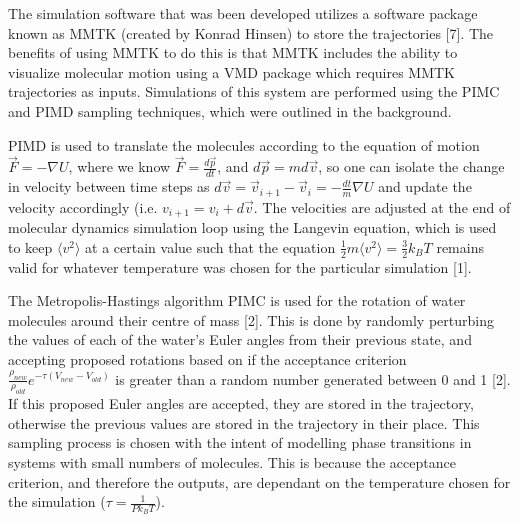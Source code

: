 \documentclass{ece}
\begin{document}
The simulation software that was been developed utilizes a software package known as \gls{MMTK} (created by Konrad Hinsen) to store the trajectories [7]. The benefits of using MMTK to do this is that MMTK includes the ability to visualize molecular motion using a \gls{VMD} package which requires MMTK trajectories as inputs. Simulations of this system are performed using the PIMC and PIMD sampling techniques, which were outlined in the background. 

PIMD is used to translate the molecules according to the equation of motion \begin{math} \vec{F} = -\nabla{U} \end{math}, where we know \begin{math} \vec{F} = \frac{d \vec{p}}{dt} \end{math}, and \begin{math} d \vec{p} = m d \vec{v} \end{math}, so one can isolate the change in velocity between time steps as \begin{math} d \vec{v} = \vec{v}_{i+1} - \vec{v}_i = - \frac{dt}{m} \nabla{U} \end{math} and update the velocity accordingly (i.e. \begin{math} v_{i+1} = v_i + d \vec{v} \end{math}. The velocities are adjusted at the end of molecular dynamics simulation loop using the Langevin equation, which is used to keep \begin{math} \langle v^2 \rangle \end{math} at a certain value such that the equation \begin{math} \frac{1}{2} m \langle v^2 \rangle = \frac{3}{2} k_B T \end{math} remains valid for whatever temperature was chosen for the particular simulation [1].

The Metropolis-Hastings algorithm \gls{PIMC} is used for the rotation of water molecules around their centre of mass [2]. This is done by randomly perturbing the values of each of the water's Euler angles from their previous state, and accepting proposed rotations based on if the acceptance criterion \begin{math} \frac{\rho_{new}}{\rho_{old}} e^{- \tau ( V_{new} - V_{old} )} \end{math} is greater than a random number generated between 0 and 1 [2]. If this proposed Euler angles are accepted, they are stored in the trajectory, otherwise the previous values are stored in the trajectory in their place. This sampling process is chosen with the intent of modelling phase transitions in systems with small numbers of molecules. This is because the acceptance criterion, and therefore the outputs, are dependant on the temperature chosen for the simulation (\begin{math} \tau = \frac{1}{P k_B T} \end{math}). 
\end{document}
